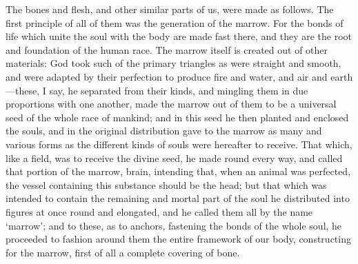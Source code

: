 \documentclass[11pt,letter]{article}
\begin{document}
\par  The bones and flesh, and other similar parts of us, were made as follows. The first principle of all of them was the generation of the marrow. For the bonds of life which unite the soul with the body are made fast there, and they are the root and foundation of the human race. The marrow itself is created out of other materials: God took such of the primary triangles as were straight and smooth, and were adapted by their perfection to produce fire and water, and air and earth—these, I say, he separated from their kinds, and mingling them in due proportions with one another, made the marrow out of them to be a universal seed of the whole race of mankind; and in this seed he then planted and enclosed the souls, and in the original distribution gave to the marrow as many and various forms as the different kinds of souls were hereafter to receive. That which, like a field, was to receive the divine seed, he made round every way, and called that portion of the marrow, brain, intending that, when an animal was perfected, the vessel containing this substance should be the head; but that which was intended to contain the remaining and mortal part of the soul he distributed into figures at once round and elongated, and he called them all by the name ‘marrow’; and to these, as to anchors, fastening the bonds of the whole soul, he proceeded to fashion around them the entire framework of our body, constructing for the marrow, first of all a complete covering of bone.
\end{document}
